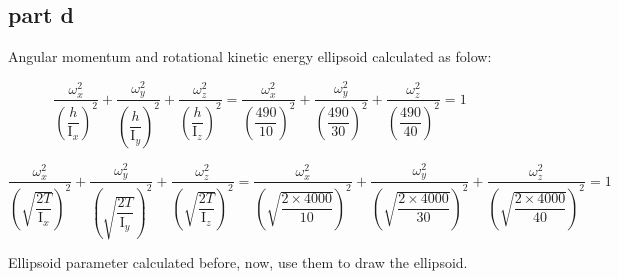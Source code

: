 \subsection{part d}

Angular momentum and rotational kinetic energy ellipsoid calculated as folow:

\begin{equation}
    \dfrac{\omega_x^2}{\left(\dfrac{h}{\mathrm{I}_x}\right)^2} +
    \dfrac{\omega_y^2}{\left(\dfrac{h}{\mathrm{I}_y}\right)^2} +
    \dfrac{\omega_z^2}{\left(\dfrac{h}{\mathrm{I}_z}\right)^2} =
    \dfrac{\omega_x^2}{\left(\dfrac{490}{10}\right)^2} +
    \dfrac{\omega_y^2}{\left(\dfrac{490}{30}\right)^2} +
    \dfrac{\omega_z^2}{\left(\dfrac{490}{40}\right)^2} =
     1
\end{equation}


\begin{equation}
    \dfrac{\omega_x^2}{\left(\sqrt{\dfrac{2T}{\mathrm{I}_x}}\right)^2} +
    \dfrac{\omega_y^2}{\left(\sqrt{\dfrac{2T}{\mathrm{I}_y}}\right)^2} +
    \dfrac{\omega_z^2}{\left(\sqrt{\dfrac{2T}{\mathrm{I}_z}}\right)^2} =
    \dfrac{\omega_x^2}{\left(\sqrt{\dfrac{2\times 4000}{10}}\right)^2} +
    \dfrac{\omega_y^2}{\left(\sqrt{\dfrac{2\times 4000}{30}}\right)^2} +
    \dfrac{\omega_z^2}{\left(\sqrt{\dfrac{2\times 4000}{40}}\right)^2} = 1
\end{equation}

Ellipsoid parameter calculated before, now, use them to draw the ellipsoid.

